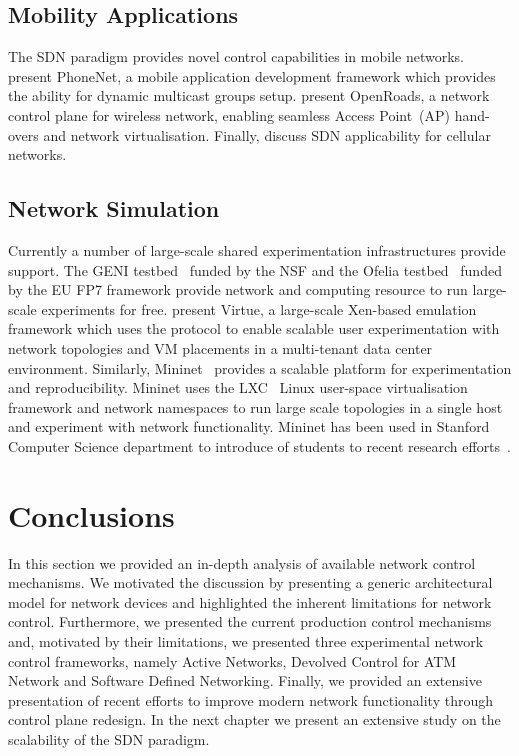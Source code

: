 \subsection{Mobility Applications}

The SDN paradigm provides novel control capabilities in mobile networks.
 present PhoneNet, a mobile application development framework
which provides the ability for dynamic multicast groups setup.
 present OpenRoads, a network control plane for wireless
network, enabling seamless Access Point~(AP) hand-overs and network
virtualisation.  Finally,  discuss SDN applicability for
cellular networks.

\subsection{Network Simulation}

Currently a number of large-scale shared experimentation infrastructures provide
\of support. The GENI testbed~ funded by the NSF and the Ofelia
testbed~ funded by the EU FP7 framework provide network and
computing resource to run large-scale experiments for free.  
present Virtue, a large-scale Xen-based emulation framework which uses the \of
protocol to enable scalable user experimentation with network topologies and VM
placements in a multi-tenant data center environment. Similarly,
Mininet~  provides a scalable platform  for \of
experimentation and reproducibility. Mininet uses the LXC~ Linux
user-space virtualisation framework and network namespaces to run large scale
topologies in a single host and experiment with network functionality.  Mininet
has been used in Stanford Computer Science department to introduce of students
to recent research efforts~. 

\section{Conclusions}

In this section we provided an in-depth analysis of available network control
mechanisms.  We motivated the discussion by presenting a generic architectural
model for network devices and highlighted the inherent limitations for network
control. Furthermore, we presented the current production  control mechanisms
and, motivated by their limitations, we presented three experimental network
control frameworks, namely Active Networks, Devolved Control for ATM Network and
Software Defined Networking. Finally, we provided an extensive presentation of
recent efforts to improve modern network functionality through control plane
redesign. In the next chapter we present an extensive study on the scalability
of the SDN paradigm. 
